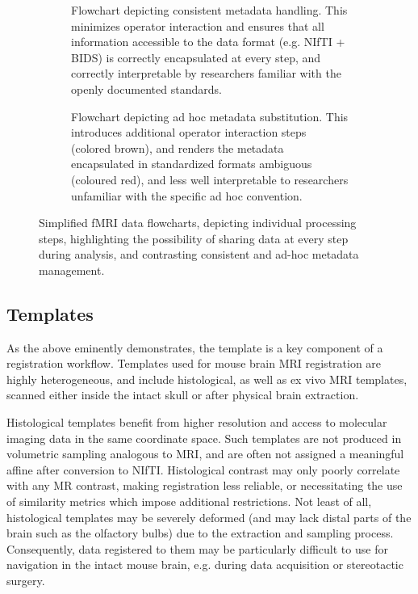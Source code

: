 \begin{figure*}[h!]
	\begin{subfigure}{\textwidth}
		\centering
		\vspace{-2.5em}
		\caption{
			Flowchart depicting consistent metadata handling. This minimizes operator interaction and ensures that all information accessible to the data format (e.g. NIfTI + BIDS) is correctly encapsulated at every step, and correctly interpretable by researchers familiar with the openly documented standards.
			}
		\label{fig:mdg}
	\end{subfigure}
	\begin{subfigure}{\textwidth}
		\centering
		\vspace{-2.5em}
		\caption{
			Flowchart depicting ad hoc metadata substitution. This introduces additional operator interaction steps (colored brown), and renders the metadata encapsulated in standardized formats ambiguous (coloured red), and less well interpretable to researchers unfamiliar with the specific ad hoc convention.
			}
		\label{fig:mdb}
	\end{subfigure}
	\caption{
		Simplified fMRI data flowcharts, depicting individual processing steps, highlighting the possibility of sharing data at every step during analysis, and contrasting consistent and ad-hoc metadata management.
		}
	\label{fig:md}
\end{figure*}

\subsection{Templates}
As the above eminently demonstrates, the template is a key component of a registration workflow.
Templates used for mouse brain MRI registration are highly heterogeneous, and include histological, as well as ex vivo MRI templates, scanned either inside the intact skull or after physical brain extraction.

Histological templates benefit from higher resolution and access to molecular imaging data in the same coordinate space.
Such templates are not produced in volumetric sampling analogous to MRI, and are often not assigned a meaningful affine after conversion to NIfTI.
Histological contrast may only poorly correlate with any MR contrast, making registration less reliable, or necessitating the use of similarity metrics which impose additional restrictions.
Not least of all, histological templates may be severely deformed (and may lack distal parts of the brain such as the olfactory bulbs) due to the extraction and sampling process.
Consequently, data registered to them may be particularly difficult to use for navigation in the intact mouse brain, e.g. during data acquisition or stereotactic surgery.

